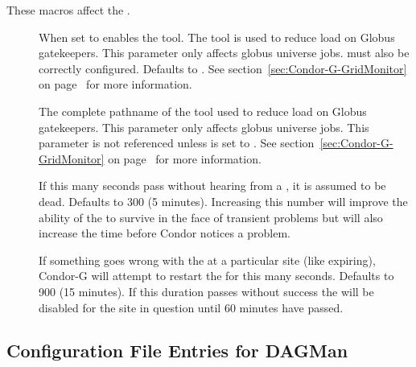 These macros affect the .
\begin{description}

\item[] \label{param:EnableGridMonitor}
  When set to  enables the  tool.  The
   tool is used to reduce load on Globus gatekeepers.
  This parameter only affects globus universe jobs.
   must also be correctly configured.
  Defaults to .
  See section~\ref{sec:Condor-G-GridMonitor} on
  page~\pageref{sec:Condor-G-GridMonitor}
  for more information.

\item[] \label{param:GridMonitor}
  The complete pathname of the  tool used to reduce load on
  Globus gatekeepers.  This parameter only affects globus
  universe jobs.  This parameter is not referenced unless
   is set to . 
  See section~\ref{sec:Condor-G-GridMonitor} on
  page~\pageref{sec:Condor-G-GridMonitor}
  for more information.

\item[] \label{param:GridMonitorHeartbeatTimeout}
  If this many seconds pass without hearing from a , it is
  assumed to be dead.  Defaults to 300 (5 minutes).  Increasing this number
  will improve the ability of the  to survive in the face of
  transient problems but will also increase the time before Condor notices a
  problem.

\item[] \label{param:GridMonitorRetryDuration}
  If something goes wrong with the  at a particular site
  (like  expiring), Condor-G will
  attempt to restart the  for this many seconds.  Defaults
  to 900 (15 minutes).  If this duration passes without success the
   will be disabled for the site in question until 60
  minutes have passed.

\end{description}



\subsection{\label{sec:DAGMan-Config-File-Entries}Configuration File 
Entries for DAGMan}


